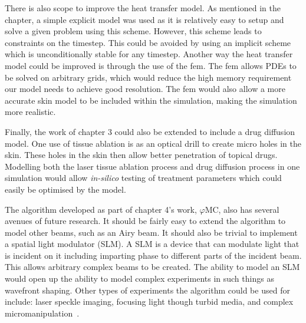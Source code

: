 There is also scope to improve the heat transfer model.
As mentioned in the chapter, a simple explicit model was used as it is relatively easy to setup and solve a given problem using this scheme.
However, this scheme leads to constraints on the timestep.
This could be avoided by using an implicit scheme which is unconditionally stable for any timestep.
Another way the heat transfer model could be improved is through the use of the \gls*{fem}.
The \gls*{fem} allows PDEs to be solved on arbitrary grids, which would reduce the high memory requirement our model needs to achieve good resolution.
The \gls*{fem} would also allow a more accurate skin model to be included within the simulation, making the simulation more realistic.

Finally, the work of chapter 3 could also be extended to include a drug diffusion model.
One use of tissue ablation is as an optical drill to create micro holes in the skin. 
These holes in the skin then allow better penetration of topical drugs.
Modelling both the laser tissue ablation process and drug diffusion process in one simulation would allow \textit{in-silico} testing of treatment parameters which could easily be optimised by the model.

\medskip

The algorithm developed as part of chapter 4's work, $\varphi$MC, also has several avenues of future research.
It should be fairly easy to extend the algorithm to model other beams, such as an Airy beam.
It should also be trivial to implement a spatial light modulator (SLM)\@.
A SLM is a device that can modulate light that is incident on it including imparting phase to different parts of the incident beam.
This allows arbitrary complex beams to be created.
The ability to model an SLM would open up the ability to model complex experiments in such things as wavefront shaping.
Other types of experiments the algorithm could be used for include: laser speckle imaging, focusing light though turbid media, and complex micromanipulation~\cite{vellekoop2007focusing,horstmeyer2015guidestar,vcivzmar2010situ}.

\medskip

